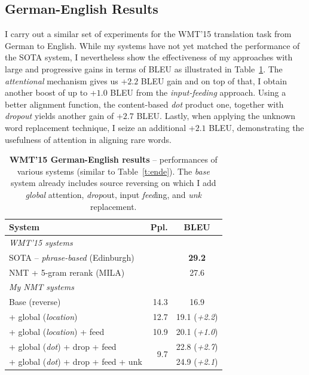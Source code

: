 \subsection{German-English Results}
I carry out a similar set of experiments for the WMT'15 translation task from German
to English. 
While my systems have not yet matched the performance of the 
SOTA system, I nevertheless show the effectiveness of my
approaches with large and progressive gains in terms of BLEU as illustrated in
Table~\ref{t:deen}. 
The {\it attentional} mechanism gives us +$2.2$ BLEU gain and on top of that, I
obtain another boost of up to +$1.0$ BLEU from the {\it input-feeding} approach.
Using a better alignment function, the content-based {\it dot} product one,
together with {\it dropout} yields another gain of +$2.7$ BLEU. Lastly, when
applying the unknown word replacement technique, I seize an additional +$2.1$
BLEU, demonstrating the usefulness of attention in aligning rare words.
\begin{table}
\centering
\begin{tabular}{l|r|c}
\bf{System} & \bf{Ppl.} & \bf{BLEU}\\
  \hline
\multicolumn{3}{l}{{\it WMT'15 systems}}\\
  \hline
SOTA -- {\it phrase-based} (Edinburgh) &  & {\bf 29.2}\\ %
NMT + 5-gram rerank (MILA) &  & 27.6\\ %
  \hline
\multicolumn{3}{l}{{\it My NMT systems}}\\
  \hline
Base (reverse) & 14.3 & 16.9\\
  \hdashline
+ global ({\it location}) & 12.7 & 19.1 ({\it +2.2}) \\
+ global ({\it location}) + feed & 10.9 & 20.1 ({\it +1.0})\\
  \hdashline
+ global ({\it dot}) + drop + feed & \multirow{ 2}{*}{9.7} & 22.8 ({\it +2.7})\\
+ global ({\it dot}) + drop + feed + unk &  & 24.9 ({\it +2.1})\\
\end{tabular}
\caption[WMT'15 German-English results]{{\bf WMT'15 German-English results} -- 
performances of various systems (similar to 
Table~\ref{t:ende}). The {\it base} system already includes source reversing
on which I add {\it global} attention, {\it drop}out, input {\it feed}ing, and
{\it unk} replacement.}
\label{t:deen}
\end{table}

